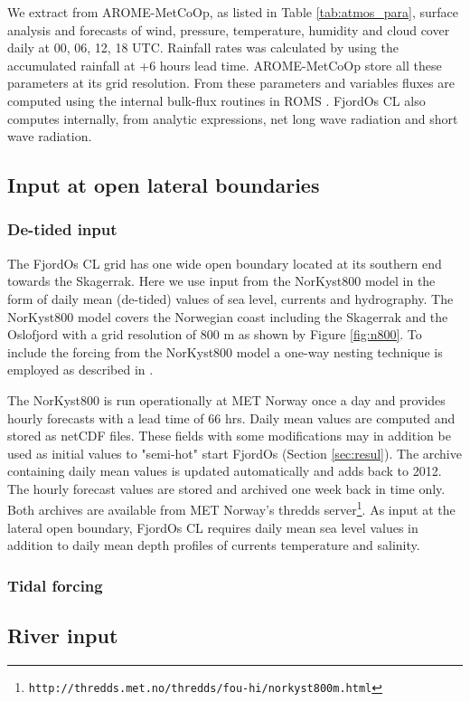 We extract from AROME-MetCoOp, as listed in Table \ref{tab:atmos_para}, surface analysis and forecasts of wind, pressure, temperature, humidity and cloud cover daily at 00, 06, 12, 18 UTC. Rainfall rates was calculated by using the accumulated rainfall at +6 hours lead time. AROME-MetCoOp store all these parameters at its grid resolution. From these parameters and variables fluxes are computed using the internal bulk-flux routines in ROMS \citep[e.g.,][]{roed:deber:2004}. FjordOs CL also computes internally, from analytic expressions, net long wave radiation and short wave radiation.


\subsection{Input at open lateral boundaries}
\label{subsec:lateral}

\subsubsection{De-tided input}
\label{subsubsec:detid}
The FjordOs CL grid has one wide open boundary located at its southern end towards the Skagerrak. Here we use input from the NorKyst800 model in the form of daily mean (de-tided) values of sea level, currents and hydrography. The NorKyst800 model covers the Norwegian coast including the Skagerrak and the Oslofjord with a grid resolution of 800 m as shown by Figure \ref{fig:n800}. To include the forcing from the NorKyst800 model a one-way nesting technique is employed as described in \cite{march:etal:2001}.  

The NorKyst800 is run operationally at MET Norway once a day and provides hourly forecasts with a lead time of 66 hrs. Daily mean values are computed and stored as netCDF files. These fields with some modifications may in addition be used as initial values to "semi-hot" start FjordOs (Section \ref{sec:resul}). The archive containing daily mean values is updated automatically and adds back to 2012. The hourly forecast values are stored and archived one week back in time only. Both archives are available from MET Norway's thredds server\footnote{\texttt{http://thredds.met.no/thredds/fou-hi/norkyst800m.html}}. As input at the lateral open boundary, FjordOs CL requires daily mean sea level values in addition to daily mean depth profiles of currents temperature and salinity.

\subsubsection{Tidal forcing}
\label{subsubsec:tides}


\subsection{River input}
\label{subsec:river}


